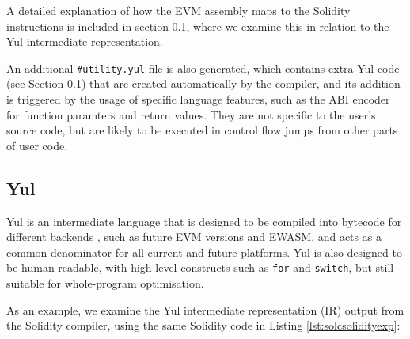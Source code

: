 A detailed explanation of how the EVM assembly maps to the Solidity instructions
is included in section \ref{section:Yul}, where we examine this in relation to the Yul
intermediate representation.

An additional \texttt{\#utility.yul} file is also generated, which contains extra Yul code (see Section \ref{section:Yul}) that are
created automatically by the compiler, and its addition is triggered by the usage of
specific language features, such as the ABI encoder for function paramters and return values.
They are not specific to the user's source code, but are likely to be executed in control flow
jumps from other parts of user code.


\subsection{Yul}
\label{section:Yul}

Yul is an intermediate language that is designed to be compiled into bytecode for different
backends \cite{solcyul}, such as future EVM versions and EWASM, and acts as a common denominator
for all current and future platforms. Yul is also designed to be human readable, with high level constructs
such as \texttt{for} and \texttt{switch}, but still suitable for whole-program optimisation.

As an example, we examine the Yul intermediate representation (IR) output from the Solidity compiler,
using the same Solidity code in Listing \ref{lst:solcsolidityexp}:\\

